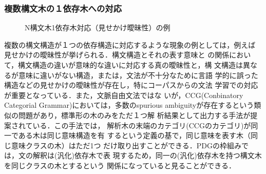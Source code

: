 \begin{comment}

  # Parse Tree [1] 
  s[0,7,is/be]:207
    +--np[0,2,hobby/n]:108
    |     +--det[0,1,my/det]:101
    |     +--n[1,2,hobby/n]:104
    +--vp[2,7,is/be]:182
          +--be[2,3,is/be]:117
          +--np[3,7,birds/n]:179
                +--np[3,5,birds/n]:132
                |     +----ving[3,4,watching/ving]:121
                |     +----n[4,5,birds/n]:128
                +--pp[5,7,with/pre]:176
                      +----pre[5,6,with/pre]:165
                      +----np[6,7,telescope/n]:170
                              +----n[6,7,telescope/n]:168

  #### Dependency Structure [1]
  [is/be,2]
    + <-(dsc-31)- [birds/n,4]
    |         + <-(adjs-3)- [watching/ving,3]
    |         + <-(npp-23)- [with/pre,5]
    |                   + <-(pre-20)- [telescope/n,6]
    + <-(sub-35)- [hobby/n,1]
              + <-(det-1)- [my/det,0]

  #### Dependency Structure [2]
  [is/be,2]
    + <-(dsc-31)- [birds/n,4]
    |         + <-(adjo-4)- [watching/ving,3]
    |         + <-(npp-23)- [with/pre,5]
    |                   + <-(pre-20)- [telescope/n,6]
    + <-(sub-35)- [hobby/n,1]
              + <-(det-1)- [my/det,0]

\end{comment}

\subsubsection{複数構文木の１依存木への対応}

\begin{figure}[t]
\begin{center}
\end{center}
\myfiglabelskip
\caption{N構文木1依存木対応（見せかけ曖昧性）の例}
\label{fig:SuriousNtoOneMapping}
\end{figure}

複数の構文構造が１つの依存構造に対応するような現象の例としては，例えば
見せかけの曖昧性が挙げられる\cite{Noro02}．構文構造とそれの表す意味と
の関係において，構文構造の違いが意味的な違いに対応する真の曖昧性と，構
文構造は異なるが意味に違いがない構造，または，文法が不十分なために言語
学的に誤った構造などの見せかけの曖昧性が存在し，特にコーパスからの文法
学習での対応が重要となっている\cite{Noro05}．また，文脈自由文法ではな
いが，CCG(Conbinatory Categorial Grammar)においては，多数のspurious
ambiguityが存在するという類似の問題があり，標準形の木のみをただ１つ解
析結果として出力する手法が提案されている\cite{Eisner96b}．この手法では，
解析木の末端のカテゴリ(CCGのカテゴリ)が同一である木は同じ意味構造を有
するという定義の基で，同じ意味を表す木（同じ意味クラスの木）はただ1つ
だけ取り出すことができる．PDGの枠組みでは，文の解釈は(汎化)依存木で表
現するため，同一の(汎化)依存木を持つ構文木を同じクラスの木とするという
関係になっていると見ることができる．

